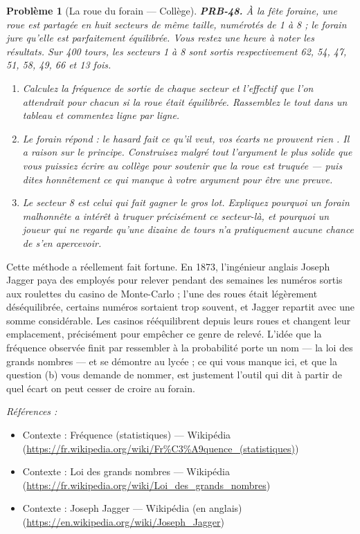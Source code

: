 \documentclass[11pt]{article}
\newtheorem{problem}{Problème}
\newenvironment{refs}{\par\small\noindent\emph{Références :}\begin{itemize}\setlength\itemsep{0pt}}{\end{itemize}\normalsize}
\begin{document}
\begin{problem}[{La roue du forain --- Collège}]
\textbf{PRB-48.} À la fête foraine, une roue est partagée en huit secteurs de même taille,
numérotés de 1 à 8 ; le forain jure qu'elle est parfaitement équilibrée. Vous restez une heure à
noter les résultats. Sur 400 tours, les secteurs 1 à 8 sont sortis respectivement 62, 54, 47, 51,
58, 49, 66 et 13 fois.
\begin{enumerate}
\item[(a)] Calculez la fréquence de sortie de chaque secteur et l'effectif que l'on attendrait pour
chacun si la roue était équilibrée. Rassemblez le tout dans un tableau et commentez ligne par
ligne.
\item[(b)] Le forain répond : \og{} le hasard fait ce qu'il veut, vos écarts ne prouvent rien \fg{}. Il a raison
sur le principe. Construisez malgré tout l'argument le plus solide que vous puissiez écrire au
collège pour soutenir que la roue est truquée --- puis dites honnêtement ce qui manque à votre
argument pour être une preuve.
\item[(c)] Le secteur 8 est celui qui fait gagner le gros lot. Expliquez pourquoi un forain malhonnête a
intérêt à truquer précisément ce secteur-là, et pourquoi un joueur qui ne regarde qu'une dizaine de
tours n'a pratiquement aucune chance de s'en apercevoir.
\end{enumerate}

\end{problem}

\noindent Cette méthode a réellement fait fortune. En 1873, l'ingénieur anglais Joseph
Jagger paya des employés pour relever pendant des semaines les numéros sortis aux roulettes du
casino de Monte-Carlo ; l'une des roues était légèrement déséquilibrée, certains numéros sortaient
trop souvent, et Jagger repartit avec une somme considérable. Les casinos rééquilibrent depuis
leurs roues et changent leur emplacement, précisément pour empêcher ce genre de relevé. L'idée que
la fréquence observée finit par ressembler à la probabilité porte un nom --- la loi des grands
nombres --- et se démontre au lycée ; ce qui vous manque ici, et que la question (b) vous demande de
nommer, est justement l'outil qui dit à partir de quel écart on peut cesser de croire au
forain.

\begin{refs}
\item Contexte : Fréquence (statistiques) --- Wikipédia (\url{https://fr.wikipedia.org/wiki/Fr%C3%A9quence_(statistiques)})
\item Contexte : Loi des grands nombres --- Wikipédia (\url{https://fr.wikipedia.org/wiki/Loi_des_grands_nombres})
\item Contexte : Joseph Jagger --- Wikipédia (en anglais) (\url{https://en.wikipedia.org/wiki/Joseph_Jagger})
\end{refs}
\end{document}
